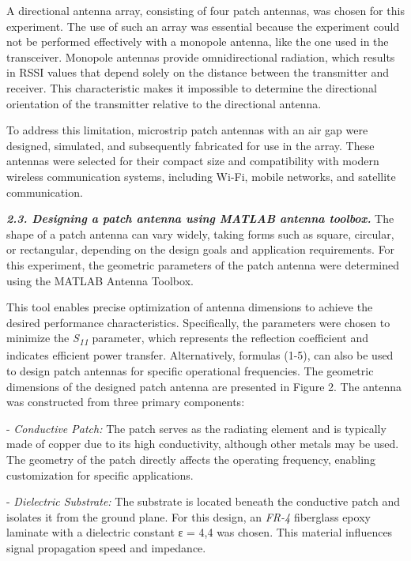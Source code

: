 \begin{multicols}{2}
A directional antenna array, consisting of four patch antennas, was
chosen for this experiment. The use of such an array was essential
because the experiment could not be performed effectively with a
monopole antenna, like the one used in the transceiver. Monopole
antennas provide omnidirectional radiation, which results in RSSI values
that depend solely on the distance between the transmitter and receiver.
This characteristic makes it impossible to determine the directional
orientation of the transmitter relative to the directional antenna.

To address this limitation, microstrip patch antennas with an air gap
were designed, simulated, and subsequently fabricated for use in the
array. These antennas were selected for their compact size and
compatibility with modern wireless communication systems, including
Wi-Fi, mobile networks, and satellite communication.

\emph{{\bfseries 2.3. Designing a patch antenna using MATLAB antenna
toolbox.}} The shape of a patch antenna can vary widely, taking forms
such as square, circular, or rectangular, depending on the design goals
and application requirements. For this experiment, the geometric
parameters of the patch antenna were determined using the MATLAB Antenna
Toolbox.

This tool enables precise optimization of antenna dimensions to achieve
the desired performance characteristics. Specifically, the parameters
were chosen to minimize the \emph{S\textsubscript{11 \hspace{0pt}}}
parameter, which represents the reflection coefficient and indicates
efficient power transfer. Alternatively, formulas (1-5), can also be
used to design patch antennas for specific operational frequencies. The
geometric dimensions of the designed patch antenna are presented in
Figure 2. The antenna was constructed from three primary components:

- \emph{Conductive Patch:} The patch serves as the radiating element and
is typically made of copper due to its high conductivity, although
other metals may be used. The geometry of the patch directly affects
the operating frequency, enabling customization for specific
applications.

- \emph{Dielectric Substrate:} The substrate is located beneath the
conductive patch and isolates it from the ground plane. For this
design, an \emph{FR-4} fiberglass epoxy laminate with a dielectric
constant ε = 4,4 was chosen. This material influences signal
propagation speed and impedance.


\end{multicols}
